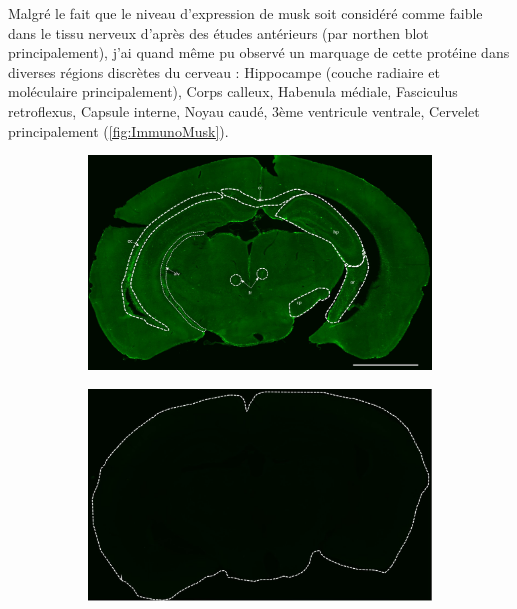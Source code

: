 	Malgré le fait que le niveau d'expression de \gls{musk} soit considéré comme faible dans le tissu nerveux d'après des études antérieurs (par northen blot principalement), j'ai quand même pu observé un marquage de cette protéine dans diverses régions discrètes du cerveau : Hippocampe (couche radiaire et moléculaire principalement), Corps calleux, Habenula médiale, Fasciculus retroflexus, Capsule interne, Noyau caudé, 3ème ventricule ventrale, Cervelet principalement (\cref{fig:ImmunoMusk}). 
	
	\begin{figure}[h] %
		\begin{center}
			\begin{subfigure}[h]{0.99\textwidth}
				\caption{}
				\label{fig:locaMusK}
				\includegraphics[width=\textwidth]{./Images/Immuno/Musk/loca_MuSK.jpg}
			\end{subfigure}
			\begin{subfigure}[h]{0.49\textwidth}
				\caption{}
				\label{fig:locaMusKCtrl}
				\includegraphics[width=\textwidth]{./Images/Immuno/Musk/loca_MuSK_ctrl.jpg}
			\end{subfigure}
			

\end{center}
\end{figure}
